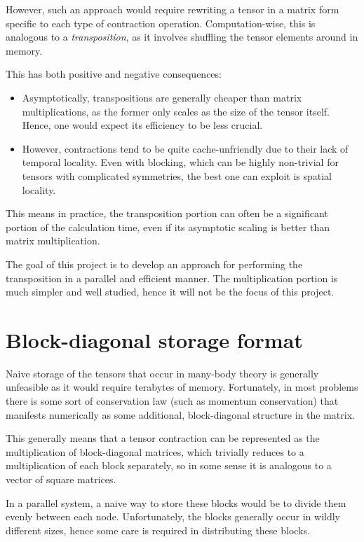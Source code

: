\documentclass[fleqn, 12pt]{article}
\begin{document}
However, such an approach would require rewriting a tensor in a matrix form
specific to each type of contraction operation.  Computation-wise, this is
analogous to a \textit{transposition}, as it involves shuffling the tensor
elements around in memory.

This has both positive and negative consequences:
\begin{itemize}
\item Asymptotically, transpositions are generally cheaper than matrix
  multiplications, as the former only scales as the size of the tensor itself.
  Hence, one would expect its efficiency to be less crucial.
\item However, contractions tend to be quite cache-unfriendly due to their
  lack of temporal locality.  Even with blocking, which can be highly
  non-trivial for tensors with complicated symmetries, the best one can
  exploit is spatial locality.
\end{itemize}
This means in practice, the transposition portion can often be a significant
portion of the calculation time, even if its asymptotic scaling is better than
matrix multiplication.

The goal of this project is to develop an approach for performing the
transposition in a parallel and efficient manner.  The multiplication portion
is much simpler and well studied, hence it will not be the focus of this
project.

\section{Block-diagonal storage format}

Naive storage of the tensors that occur in many-body theory is generally
unfeasible as it would require terabytes of memory.  Fortunately, in most
problems there is some sort of conservation law (such as momentum
conservation) that manifests numerically as some additional, block-diagonal
structure in the matrix.

This generally means that a tensor contraction can be represented as the
multiplication of block-diagonal matrices, which trivially reduces to a
multiplication of each block separately, so in some sense it is analogous to a
vector of square matrices.

In a parallel system, a naive way to store these blocks would be to divide
them evenly between each node.  Unfortunately, the blocks generally occur in
wildly different sizes, hence some care is required in distributing these
blocks.
\end{document}
